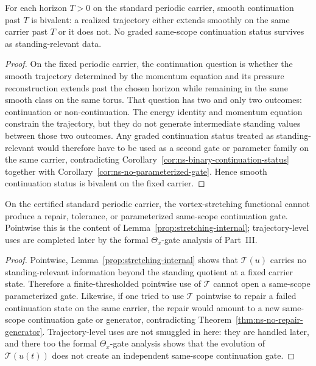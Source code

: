 \begin{manualproposition}
\label{prop:13-5B-energy-momentum-force-binary}
For each horizon $T>0$ on the standard periodic carrier, smooth continuation past $T$ is bivalent:
a realized trajectory either extends smoothly on the same carrier past $T$ or it does not.
No graded same-scope continuation status survives as standing-relevant data.
\end{manualproposition}

\begin{proof}
On the fixed periodic carrier, the continuation question is whether the smooth trajectory determined
by the momentum equation and its pressure reconstruction extends past the chosen horizon while
remaining in the same smooth class on the same torus.  That question has two and only two outcomes:
continuation or non-continuation.  The energy identity and momentum equation constrain the
trajectory, but they do not generate intermediate standing values between those two outcomes.
Any graded continuation status treated as standing-relevant would therefore have to be used as a
second gate or parameter family on the same carrier, contradicting
Corollary~\ref{cor:ns-binary-continuation-status} together with
Corollary~\ref{cor:ns-no-parameterized-gate}.  Hence smooth continuation status is bivalent on the
fixed carrier.
\end{proof}

\begin{manualproposition}
\label{prop:13-5C-vortex-stretching-no-repair-no-parameterized-gates}
On the certified standard periodic carrier, the vortex-stretching functional cannot produce a repair,
tolerance, or parameterized same-scope continuation gate.  Pointwise this is the content of
Lemma~\ref{prop:stretching-internal}; trajectory-level uses are completed later by the formal
$\Theta_x$-gate analysis of Part~III.
\end{manualproposition}

\begin{proof}
Pointwise, Lemma~\ref{prop:stretching-internal} shows that $\mathcal T(u)$ carries no
standing-relevant information beyond the standing quotient at a fixed carrier state.  Therefore a
finite-thresholded pointwise use of $\mathcal T$ cannot open a same-scope parameterized gate.
Likewise, if one tried to use $\mathcal T$ pointwise to repair a failed continuation state on the same
carrier, the repair would amount to a new same-scope continuation gate or generator, contradicting
Theorem~\ref{thm:ns-no-repair-generator}.  Trajectory-level uses are not smuggled in here: they are
handled later, and there too the formal $\Theta_x$-gate analysis shows that the evolution of
$\mathcal T(u(t))$ does not create an independent same-scope continuation gate.
\end{proof}

